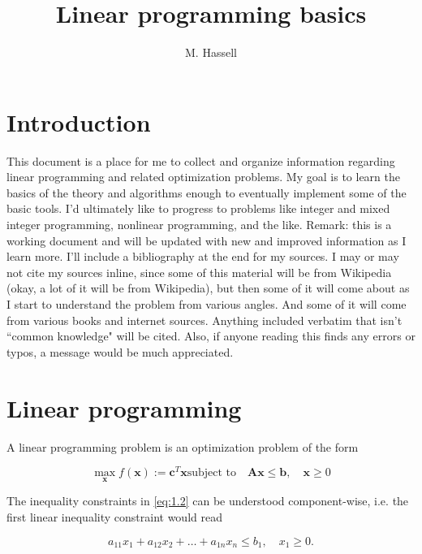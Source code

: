 \documentclass[12pt,english]{article}
\title{Linear programming basics}
\author{M. Hassell}
\begin{document}
\maketitle

\section{Introduction}\label{sec:1}

This document is a place for me to collect and organize information regarding linear programming and related optimization problems.  My goal is to learn the basics of the theory and algorithms enough to eventually implement some of the basic tools.  I'd ultimately like to progress to problems like integer and mixed integer programming, nonlinear programming, and the like.  Remark: this is a working document and will be updated with new and improved information as I learn more.   I'll include a bibliography at the end for my sources.   I may or may not cite my sources inline, since some of this material will be from Wikipedia (okay, a lot of it will be from Wikipedia), but then some of it will come about as I start to understand the problem from various angles.   And some of it will come from various books and internet sources.  Anything included verbatim that isn't ``common knowledge" will be cited.  Also, if anyone reading this finds any errors or typos, a message would be much appreciated.

\section{Linear programming}\label{sec:2}

A linear programming problem is an optimization problem of the form

\begin{subequations}
\begin{equation}\label{eq:1.1}
\max_\mathbf{x} f(\mathbf x)  := \mathbf{c}^T \mathbf{x}
\end{equation}
\begin{equation}\label{eq:1.2}
\text{subject to} \quad \mathbf{A}\mathbf{x} \leq \mathbf{b}, \quad \mathbf{x}\geq 0
\end{equation}
\end{subequations}

The inequality constraints in \eqref{eq:1.2} can be understood component-wise, i.e. the first linear inequality constraint would read

$$
a_{11}x_1 + a_{12}x_2 + \dots + a_{1n}x_n \leq b_1, \quad x_1 \geq 0.
$$
\end{document}
